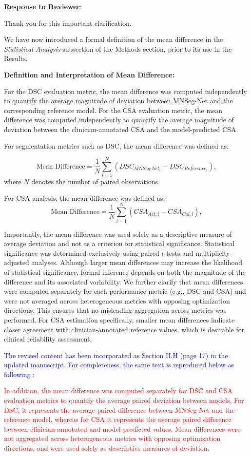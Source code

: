 \documentclass[12pt,letterpaper]{article}
\begin{document}
\begin{enumerate}
 
\textbf{Response to Reviewer}:

Thank you for this important clarification.

We have now introduced a formal definition of the mean difference in the \textit{Statistical Analysis} subsection of the Methods section, prior to its use in the Results.

\textbf{Definition and Interpretation of Mean Difference:}

For the DSC evaluation metric, the mean difference was computed independently to quantify the average magnitude of deviation between MNSeg-Net and the corresponding reference model. For the CSA evaluation metric, the mean difference was computed independently to quantify the average magnitude of deviation between the clinician-annotated CSA and the model-predicted CSA.

For segmentation metrics such as DSC, the mean difference was defined as:

\[
\text{Mean Difference} = \frac{1}{N} \sum_{i=1}^{N} (DSC_{MNSeg\text{-}Net_i} - DSC_{Reference_i}),
\]
where $N$ denotes the number of paired observations.

For CSA analysis, the mean difference was defined as:
\[
\text{Mean Difference} = \frac{1}{N} \sum_{i=1}^{N} (CSA_{Act,i} - CSA_{Cal,i}),
\]



Importantly, the mean difference was used solely as a descriptive measure of average deviation and not as a criterion for statistical significance. Statistical significance was determined exclusively using paired $t$-tests and multiplicity-adjusted analyses. Although larger mean differences may increase the likelihood of statistical significance, formal inference depends on both the magnitude of the difference and its associated variability. We further clarify that mean differences were computed separately for each performance metric (e.g., DSC and CSA) and were not averaged across heterogeneous metrics with opposing optimization directions. This ensures that no misleading aggregation across metrics was performed. For CSA estimation specifically, smaller mean differences indicate closer agreement with clinician-annotated reference values, which is desirable for clinical reliability assessment.

 \textcolor{blue}{The revised content has been incorporated as Section II.H (page 17) in the updated manuscript. For completeness, the same text is reproduced below  as following :}


\textcolor{red}{ In addition, the mean difference was computed separately for DSC and CSA evaluation metrics to quantify the average paired deviation between models. For DSC, it represents the average paired difference between MNSeg-Net and the reference model, whereas for CSA it represents the average paired difference between clinician-annotated and model-predicted values. Mean differences were not aggregated across heterogeneous metrics with opposing optimization directions, and were used solely as descriptive measures of deviation.}


\end{enumerate}
\end{document}
